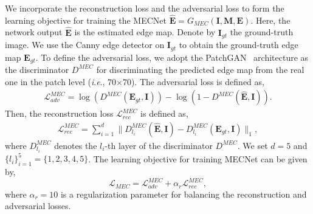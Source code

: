 \documentclass[10pt,journal,compsoc]{IEEEtran}
\newcommand{\ie}{\textit{i}.\textit{e}.}
\begin{document}
We incorporate the reconstruction loss and the adversarial loss to form the learning objective for training the MECNet $\hat{\mathbf{E}} = G_{MEC}(\mathbf{I}, \mathbf{M}, \mathbf{E})$.
%
Here, the network output $\hat{\mathbf{E}}$ is the estimated edge map.
%
Denote by $\mathbf{I}_{gt}$ the ground-truth image.
%
We use the Canny edge detector on $\mathbf{I}_{gt}$ to obtain the ground-truth edge map $\mathbf{E}_{gt}$.
%
%
%
%
To define the adversarial loss, we adopt the PatchGAN~\cite{isola2017cvpr,zhu2017unpaired} architecture as the discriminator $D^{MEC}$ for discriminating the predicted edge map from the real one in the patch level (\ie, 70$\times$70).
%
%
The adversarial loss is defined as,
%
\begin{equation}
	\begin{split}
		\mathcal{L}^{MEC}_{adv}  = \log\left(D^{MEC}(\mathbf{E}_{gt}, \mathbf{I})\right)  - \log\left(1 - D^{MEC}(\hat{\mathbf{E}}, \mathbf{I})\right).
	\end{split}
\end{equation}
%
%
Then, the reconstruction loss $\mathcal{L}_{rec}^{MEC}$ is defined as,
%
\begin{equation}\label{edge-l1}
	\begin{aligned}
		\mathcal{L}_{rec}^{MEC} =  \sum_{i=1}^{d} \parallel D_{l_i}^{MEC}(\hat{\mathbf{E}}, \mathbf{I}) -D^{MEC}_{l_i}(\mathbf{E}_{gt}, \mathbf{I}) \parallel_1, %
	\end{aligned}
\end{equation}
where $D_{l_i}^{MEC}$ denotes the $l_i$-th layer of the discriminator $D^{MEC}$.
%
We set $d = 5$ and $\{l_i\}_{i=1}^5 = \{1, 2, 3, 4, 5\}$. 
%
The learning objective for training MECNet can be given by,
\begin{equation}
	\mathcal{L}_{MEC} = \mathcal{L}^{MEC}_{adv} + \alpha_r \mathcal{L}_{rec}^{MEC},
\end{equation}
where $\alpha_r = 10$ is a regularization parameter for balancing the reconstruction and adversarial losses.
\end{document}
